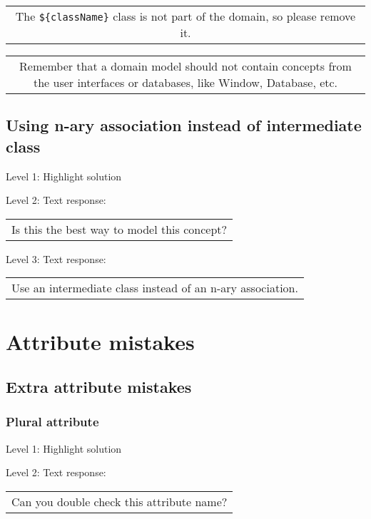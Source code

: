 \begin{tabular}{|c}
The \verb|${className}| class is not part of the domain, so please remove it.
\end{tabular} \medskip

\begin{tabular}{|c}
Remember that a domain model should not contain concepts from the user interfaces or databases, like Window, Database, etc.
\end{tabular} \medskip


\subsection{Using n-ary association instead of intermediate class}

\noindent Level 1: Highlight solution \medskip

\noindent Level 2: Text response: \medskip

\begin{tabular}{|c}
Is this the best way to model this concept?
\end{tabular} \medskip

\noindent Level 3: Text response: \medskip

\begin{tabular}{|c}
Use an intermediate class instead of an n-ary association.
\end{tabular} \medskip



\section{Attribute mistakes}

\subsection{Extra attribute mistakes}

\subsubsection{Plural attribute}

\noindent Level 1: Highlight solution \medskip

\noindent Level 2: Text response: \medskip

\begin{tabular}{|c}
Can you double check this attribute name?
\end{tabular} \medskip

